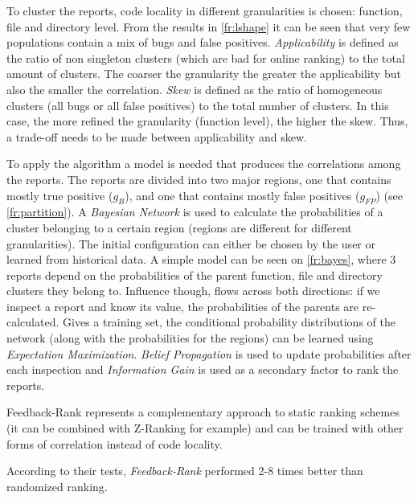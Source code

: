  To cluster the reports, code locality in different granularities is chosen: function, file and directory level. From the results in \cref{fr:lshape} it can be seen that very few populations contain a mix of bugs and false positives. \textit{Applicability} is defined as the ratio of non singleton clusters (which are bad for online ranking) to the total amount of clusters. The coarser the granularity the greater the applicability but also the smaller the correlation. \textit{Skew} is defined as the ratio of homogeneous clusters (all bugs or all false positives) to the total number of clusters. In this case, the more refined the granularity (function level), the higher the skew. Thus, a trade-off needs to be made between applicability and skew.

 To apply the algorithm a model is needed that produces the correlations among the reports. The reports are divided into two major regions, one that contains mostly true positive ($g_B$), and one that contains mostly false positives ($g_{FP}$) (see \cref{fr:partition}). A \textit{Bayesian Network} is used to calculate the probabilities of a cluster belonging to a certain region (regions are different for different granularities). The initial configuration can either be chosen by the user or learned from historical data. A simple model can be seen on \cref{fr:bayes}, where 3 reports depend on the probabilities of the parent function, file and directory clusters they belong to. Influence though, flows across both directions: if we inspect a report and know its value, the probabilities of the parents are re-calculated. Gives a training set, the conditional probability distributions of the network (along with the probabilities for the regions) can be learned using \textit{Expectation Maximization}. \textit{Belief Propagation} is used to update probabilities after each inspection and \textit{Information Gain} is used as a secondary factor to rank the reports. 

 Feedback-Rank represents a complementary approach to static ranking schemes (it can be combined with Z-Ranking for example) and can be trained with other forms of correlation instead of code locality. 

 According to their tests, \textit{Feedback-Rank} performed 2-8 times better than randomized ranking.\\

